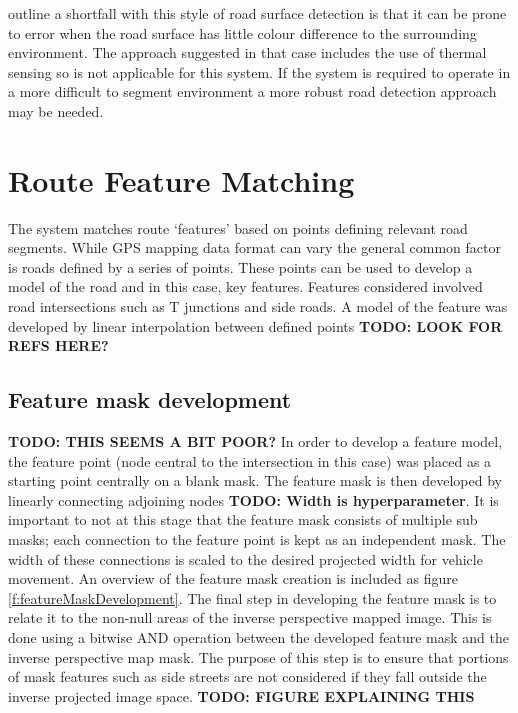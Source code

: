 \documentclass[]{aiaa-tc}%
\begin{document}
\citet{histBackRefineShadows} outline a shortfall with this style of road surface detection is that it can be prone to error when the road surface has little colour difference to the surrounding environment. The approach suggested in that case includes the use of thermal sensing so is not applicable for this system. If the system is required to operate in a more difficult to segment environment a more robust road detection approach may be needed. 


\section{Route Feature Matching}\label{sect:route_feature_matching}

The system matches route `features' based on points defining relevant road segments. While GPS mapping data format can vary the general common factor is roads defined by a series of points. These points can be used to develop a model of the road and in this case, key features. Features considered involved road intersections such as T junctions and side roads. A model of the feature was developed by linear interpolation between defined points
\textbf{TODO: LOOK FOR REFS HERE?}

\subsection{Feature mask development}
\textbf{TODO: THIS SEEMS A BIT POOR?}
In order to develop a feature model, the feature point (node central to the intersection in this case) was placed as a starting point centrally on a blank mask. The feature mask is then developed by linearly connecting adjoining nodes \textbf{TODO: Width is hyperparameter}. It is important to not at this stage that the feature mask consists of multiple sub masks; each connection to the feature point is kept as an independent mask. The width of these connections is scaled to the desired projected width for vehicle movement. An overview of the feature mask creation is included as figure \ref{f:featureMaskDevelopment}. The final step in developing the feature mask is to relate it to the non-null areas of the inverse perspective mapped image. This is done using a bitwise AND operation between the developed feature mask and the inverse perspective map mask. The purpose of this step is to ensure that portions of mask features such as side streets are not considered if they fall outside the inverse projected image space. \textbf{TODO: FIGURE EXPLAINING THIS}
\end{document}
